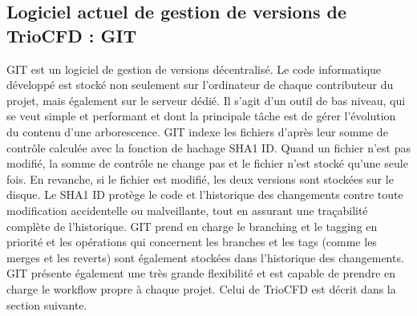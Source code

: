 \subsection{Logiciel actuel de gestion de versions de TrioCFD : GIT}
GIT est un logiciel de gestion de versions décentralisé.
Le code informatique développé est stocké non seulement sur l'ordinateur de chaque contributeur du projet, mais également sur le serveur dédié. Il s'agit d'un outil de bas niveau, qui se veut simple et performant et dont la principale tâche est de gérer l'évolution du contenu d'une arborescence. GIT indexe les fichiers d'après leur somme de contrôle calculée avec la fonction de hachage SHA1 ID. Quand un fichier n'est pas modifié, la somme de contrôle ne change pas et le fichier n'est stocké qu'une seule fois. En revanche, si le fichier est modifié, les deux versions sont stockées sur le disque. Le SHA1 ID protège le code et l'historique des changements contre toute modification accidentelle ou malveillante, tout en assurant une traçabilité complète de l'historique. GIT prend en charge le branching et le tagging en priorité et les opérations qui concernent les branches et les tags (comme les merges et les reverts) sont également stockées dans l'historique des changements. GIT présente également une très grande flexibilité et est capable de prendre en charge le workflow propre à chaque projet. Celui de TrioCFD est décrit dans la section suivante.

